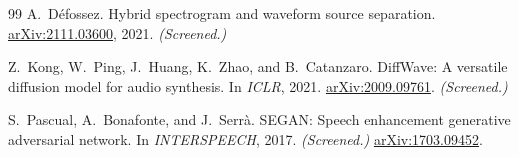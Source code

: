\documentclass[10pt,twocolumn,letterpaper]{article}
\renewcommand{\topfraction}{0.9}
\renewcommand{\dbltopfraction}{0.9}
\renewcommand{\textfraction}{0.08}
\renewcommand{\floatpagefraction}{0.8}
\renewcommand{\dblfloatpagefraction}{0.8}
\theoremstyle{remark}
\begin{document}
{\begin{thebibliography}{99}
A.~D\'efossez.
\newblock Hybrid spectrogram and waveform source separation.
\newblock \href{https://arxiv.org/abs/2111.03600}{arXiv:2111.03600}, 2021. \textit{(Screened.)}

Z.~Kong, W.~Ping, J.~Huang, K.~Zhao, and B.~Catanzaro.
\newblock DiffWave: A versatile diffusion model for audio synthesis.
\newblock In \emph{ICLR}, 2021.
\newblock \href{https://arxiv.org/abs/2009.09761}{arXiv:2009.09761}. \textit{(Screened.)}

S.~Pascual, A.~Bonafonte, and J.~Serr\`a.
\newblock SEGAN: Speech enhancement generative adversarial network.
\newblock In \emph{INTERSPEECH}, 2017. \textit{(Screened.)}
\newblock \href{https://arxiv.org/abs/1703.09452}{arXiv:1703.09452}.

\end{thebibliography}
}

\clearpage
\appendix
\renewcommand{\topfraction}{0.95}
\renewcommand{\bottomfraction}{0.95}
\renewcommand{\textfraction}{0.05}
\renewcommand{\floatpagefraction}{0.85}
\renewcommand{\dbltopfraction}{0.95}
\renewcommand{\dblfloatpagefraction}{0.85}
\setcounter{topnumber}{6}
\setcounter{bottomnumber}{6}
\setcounter{totalnumber}{10}
\setcounter{dbltopnumber}{4}




\end{document}
